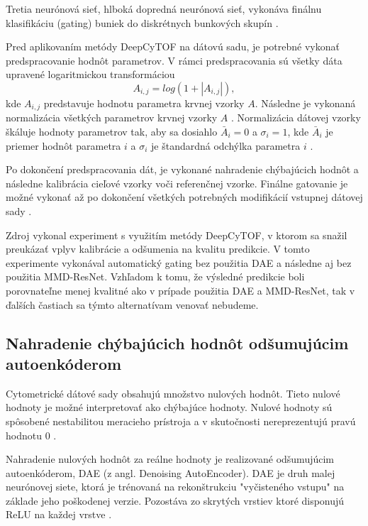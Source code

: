 Tretia neurónová sieť, hlboká dopredná neurónová sieť, vykonáva finálnu klasifikáciu (gating) buniek do diskrétnych bunkových skupín \cite{Li2017}.

Pred aplikovaním metódy DeepCyTOF na dátovú sadu, je potrebné vykonať predspracovanie hodnôt parametrov. V rámci predspracovania sú všetky dáta upravené logaritmickou transformáciou
\begin{equation}
    A_{i,j} = log(1+|A_{i,j}|),
\end{equation}
kde $A_{i,j}$ predstavuje hodnotu parametra krvnej vzorky $A$. Následne je vykonaná normalizácia všetkých parametrov krvnej vzorky $A$ \cite{Li2016, Li2017}. Normalizácia dátovej vzorky škáluje hodnoty parametrov tak, aby sa dosiahlo $\bar{A}_i=0$ a $\sigma_i=1$, kde $\bar{A}_i$ je priemer hodnôt parametra $i$ a $\sigma_i$ je štandardná odchýlka parametra $i$ \cite{Aksoy}.

Po dokončení predspracovania dát, je vykonané nahradenie chýbajúcich hodnôt a následne kalibrácia cieľové vzorky voči referenčnej vzorke. Finálne gatovanie je možné vykonať až po dokončení všetkých potrebných modifikácií vstupnej dátovej sady \cite{Li2017}. 

Zdroj \cite{Li2017} vykonal experiment s využitím metódy DeepCyTOF, v ktorom sa snažil preukázať vplyv kalibrácie a odšumenia na kvalitu predikcie. V tomto experimente vykonával automatický gating bez použitia DAE a následne aj bez použitia MMD-ResNet. Vzhľadom k tomu, že výsledné predikcie boli porovnateľne menej kvalitné ako v prípade použitia DAE a MMD-ResNet, tak v ďalších častiach sa týmto alternatívam venovať nebudeme.

\subsection{Nahradenie chýbajúcich hodnôt odšumujúcim autoenkóderom}

Cytometrické dátové sady obsahujú množstvo nulových hodnôt. Tieto nulové hodnoty je možné interpretovať ako chýbajúce hodnoty. Nulové hodnoty sú spôsobené nestabilitou meracieho prístroja a v skutočnosti nereprezentujú pravú hodnotu 0 \cite{Li2017}.

Nahradenie nulových hodnôt za reálne hodnoty je realizované odšumujúcim autoenkóderom, DAE (z angl. Denoising AutoEncoder). DAE je druh malej neurónovej siete, ktorá je trénovaná na rekonštrukciu "vyčisteného vstupu" na základe jeho poškodenej verzie. Pozostáva zo skrytých vrstiev ktoré disponujú ReLU na každej vrstve \cite{Li2017}.

